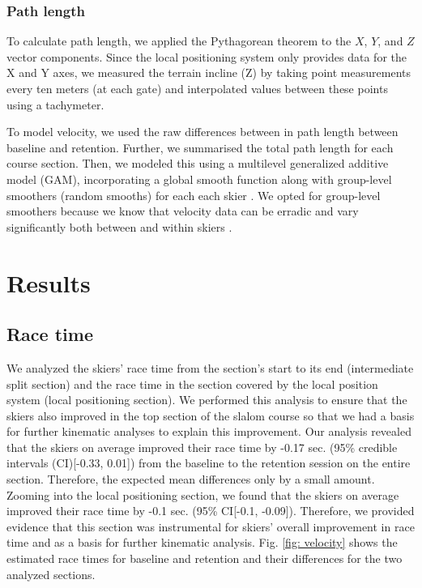 \documentclass{article}
\begin{document}
\subsubsection{Path length}
To calculate path length, we applied the Pythagorean theorem to the $X$, $Y$, and $Z$ vector components. Since the local positioning system only provides data for the X and Y axes, we measured the terrain incline (Z) by taking point measurements every ten meters (at each gate) and interpolated values between these points using a tachymeter.

To model velocity, we used the raw differences between in path length between baseline and retention. Further, we summarised the total path length for each course section. Then, we modeled this using a multilevel generalized additive model (GAM), incorporating a global smooth function along with group-level smoothers (random smooths) for each each skier \cite{pedersen_hierarchical_2019}. We opted for group-level smoothers because we know that velocity data can be erradic and vary significantly both between and within skiers \cite{federolf_quantifying_2012, supej_impact_2015, reid_kinematic_2010}. 


\section{Results}

\subsection{Race time}
We analyzed the skiers' race time from the section's start to its end (intermediate split section) and the race time in the section covered by the local position system (local positioning section). We performed this analysis to ensure that the skiers also improved in the top section of the slalom course so that we had a basis for further kinematic analyses to explain this improvement. Our analysis revealed that the skiers on average improved their race time by -0.17 sec. (95\% credible intervals (CI)[-0.33, 0.01]) from the baseline to the retention session on the entire section. Therefore, the expected mean differences only by a small amount. Zooming into the local positioning section, we found that the skiers on average improved their  race time by -0.1 sec. (95\% CI[-0.1, -0.09]). Therefore, we provided evidence that this section was instrumental for skiers’ overall improvement in race time and as a basis for further kinematic analysis. Fig. \ref{fig: velocity} shows the estimated race times for baseline and retention and their differences for the two analyzed sections. 
\end{document}
